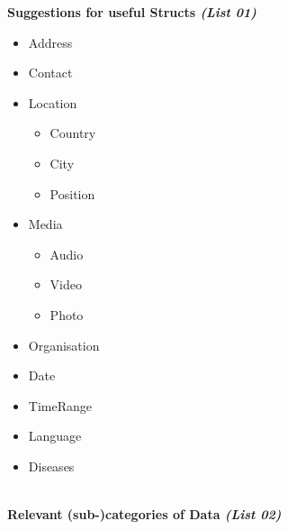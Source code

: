 \documentclass[12pt,english,a4paper,titlepage,cleardoublepage=empty,dottedtoc]{report}
\providecommand{\tightlist}{%
  \setlength{\itemsep}{0pt}\setlength{\parskip}{0pt}}
\begin{document}
\textbf{\protect\hypertarget{list-01_suggested-structs}{}{Suggestions
for useful Structs \emph{(List 01)}}}

\begin{itemize}
\tightlist
\item
  Address
\item
  Contact
\item
  Location

  \begin{itemize}
  \tightlist
  \item
    Country
  \item
    City
  \item
    Position
  \end{itemize}
\item
  Media

  \begin{itemize}
  \tightlist
  \item
    Audio
  \item
    Video
  \item
    Photo
  \end{itemize}
\item
  Organisation
\item
  Date
\item
  TimeRange
\item
  Language
\item
  Diseases
\end{itemize}

~\\
\textbf{\protect\hypertarget{list-02_data-categories}{}{Relevant
(sub-)categories of Data \emph{(List 02)}}}
\end{document}
